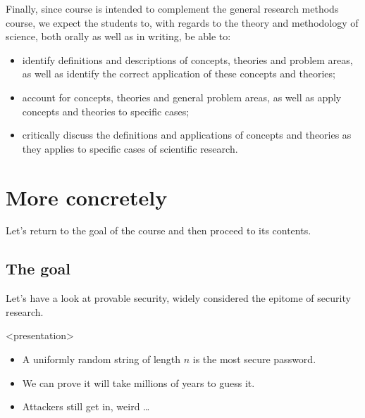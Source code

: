 Finally, since course is intended to complement the general research methods 
course, we expect the students to, with regards to the theory and  methodology 
of science, both orally as well as in writing, be able to:
\begin{itemize}
  \item identify definitions and descriptions of concepts, theories and problem 
    areas, as well as identify the correct application of these concepts and 
    theories;
  \item account for concepts, theories and general problem areas, as well as 
    apply concepts and theories to specific cases;
  \item critically discuss the definitions and applications of concepts and 
    theories as they applies to specific cases of scientific research.
\end{itemize}


\section{More concretely}

Let's return to the goal of the course and then proceed to its contents.

\subsection{The goal}

Let's have a look at provable security, widely considered the epitome of 
security research.

\begin{frame}<presentation>
  \begin{example}
    \begin{itemize}
      \item A uniformly random string of length \(n\) is the most secure 
        password.

      \item We can prove it will take millions of years to guess it.
    \end{itemize}
  \end{example}

  \pause

  \begin{remark}
    \begin{itemize}
      \item Attackers still get in, weird \dots
    \end{itemize}
  \end{remark}
\end{frame}

